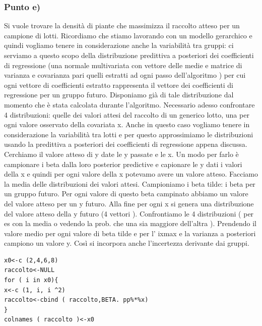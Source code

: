 \subsubsection*{Punto e)}
Si vuole trovare la densità di piante che massimizza il raccolto atteso 
per un campione di lotti. Ricordiamo che stiamo lavorando con un modello 
gerarchico e quindi vogliamo tenere in considerazione anche la variabilità tra gruppi: 
ci serviamo a questo scopo della distribuzione predittiva a posteriori dei 
coefficienti di regressione (una normale multivariata con vettore delle medie e 
matrice di varianza e covarianza pari quelli estratti ad ogni passo dell'algoritmo ) 
per cui ogni vettore di coefficienti estratto rappresenta il vettore dei coefficienti 
di regressione per un gruppo futuro. Disponiamo già di tale distribuzione dal 
momento che è stata calcolata durante l'algoritmo. 
Necessario adesso confrontare 4 distribuzioni: quelle dei valori attesi del 
raccolto di un generico lotto, una per ogni valore osservato della covariata x. 
Anche in questo caso vogliamo tenere in considerazione la variabilità tra lotti e per 
questo approssimiamo le distribuzioni usando la predittiva a posteriori dei 
coefficienti di regressione appena discussa. Cerchiamo il valore atteso di y date 
le y passate e le x. Un modo per farlo è campionare i beta dalla loro posterior 
predictive e capionare le y dati i valori della x e quindi per ogni valore della x 
potevamo avere un valore atteso. Facciamo la media delle distribuzioni dei valori 
attesi. Campioniamo i beta tilde: i beta per un gruppo futuro. Per ogni valore di 
questo beta campinato abbiamo un valore del valore atteso per un y futuro. 
Alla fine per ogni x si genera una distribuzione del valore atteso della y futuro 
(4 vettori ). Confrontiamo le 4 distribuzioni ( per es con la media o vedendo la 
prob. che una sia maggiore dell'altra ). Prendendo il valore medio per ogni valore 
di beta tilde e per l' ixmax e la varianza a posteriori campiono un valore y. 
Così si incorpora anche l'incertezza derivante dai gruppi.

\begin{lstlisting}[style=R]
x0<-c (2,4,6,8)
raccolto<-NULL
for ( i in x0){
x<-c (1, i, i ^2)
raccolto<-cbind ( raccolto,BETA. pp%*%x)
}
colnames ( raccolto )<-x0
\end{lstlisting}


